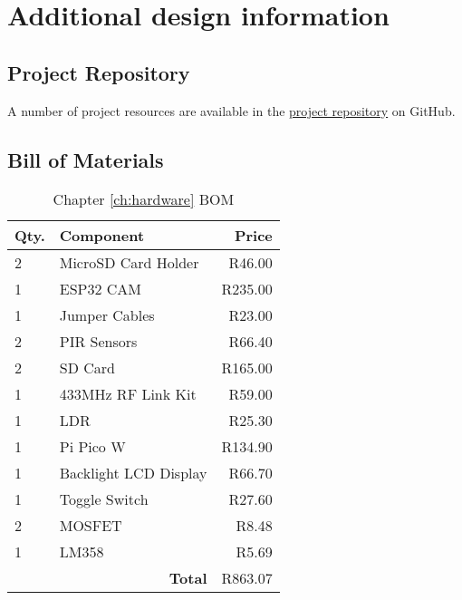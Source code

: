 \documentclass[class=report,11pt,crop=false]{standalone}
\begin{document}
\ifstandalone
\tableofcontents
\fi


\chapter{Additional design information}

\section{Project Repository}

A number of project resources are available in the \href{https://github.com/rothdu/EEE4113F-Group13-2024}{project repository} on GitHub.

\section{Bill of Materials}


\begin{table}[h]
\centering
\begin{tabular}{|l|l|r|}
\hline
\textbf{Qty.} & \textbf{Component} & \textbf{Price} \\
\hline
2 & MicroSD Card Holder & R46.00 \\
1 & ESP32 CAM & R235.00 \\
1 & Jumper Cables & R23.00 \\
2 & PIR Sensors & R66.40 \\
2 & SD Card & R165.00 \\
1 & 433MHz RF Link Kit & R59.00 \\
1 & LDR & R25.30 \\
1 & Pi Pico W & R134.90 \\
1 & Backlight LCD Display & R66.70 \\
1 & Toggle Switch & R27.60 \\
2 & MOSFET & R8.48 \\
1 & LM358 & R5.69 \\
\hline
\multicolumn{2}{|r|}{\textbf{Total}} & R863.07 \\
\hline
\end{tabular}
\caption{Chapter \ref{ch:hardware} BOM}
\label{tab:HW_BOM}
\end{table}
\end{document}
